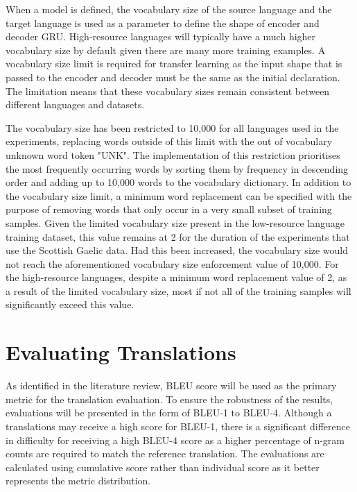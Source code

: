 When a model is defined, the vocabulary size of the source language and the target language is used as a parameter to define the shape of encoder and decoder \acrshort{GRU}. High-resource languages will typically have a much higher vocabulary size by default given there are many more training examples. A vocabulary size limit is required for transfer learning as the input shape that is passed to the encoder and decoder must be the same as the initial declaration. The limitation means that these vocabulary sizes remain consistent between different languages and datasets.

The vocabulary size has been restricted to 10,000 for all languages used in the experiments, replacing words outside of this limit with the out of vocabulary unknown word token "UNK". The implementation of this restriction prioritises the most frequently occurring words by sorting them by frequency in descending order and adding up to 10,000 words to the vocabulary dictionary.
In addition to the vocabulary size limit, a minimum word replacement can be specified with the purpose of removing words that only occur in a very small subset of training samples. Given the limited vocabulary size present in the low-resource language training dataset, this value remains at 2 for the duration of the experiments that use the Scottish Gaelic data. Had this been increased, the vocabulary size would not reach the aforementioned vocabulary size enforcement value of 10,000. For the high-resource languages, despite a minimum word replacement value of 2, as a result of the limited vocabulary size, most if not all of the training samples will significantly exceed this value.



\section{Evaluating Translations}
\label{sec:3-evaluating}

As identified in the literature review, \acrshort{BLEU} score will be used as the primary metric for the translation evaluation. To ensure the robustness of the results, evaluations will be presented in the form of \acrshort{BLEU}-1 to \acrshort{BLEU}-4. Although a translations may receive a high score for \acrshort{BLEU}-1, there is a significant difference in difficulty for receiving a high \acrshort{BLEU}-4 score as a higher percentage of n-gram counts are required to match the reference translation. The evaluations are calculated using cumulative score rather than individual score as it better represents the metric distribution. 

